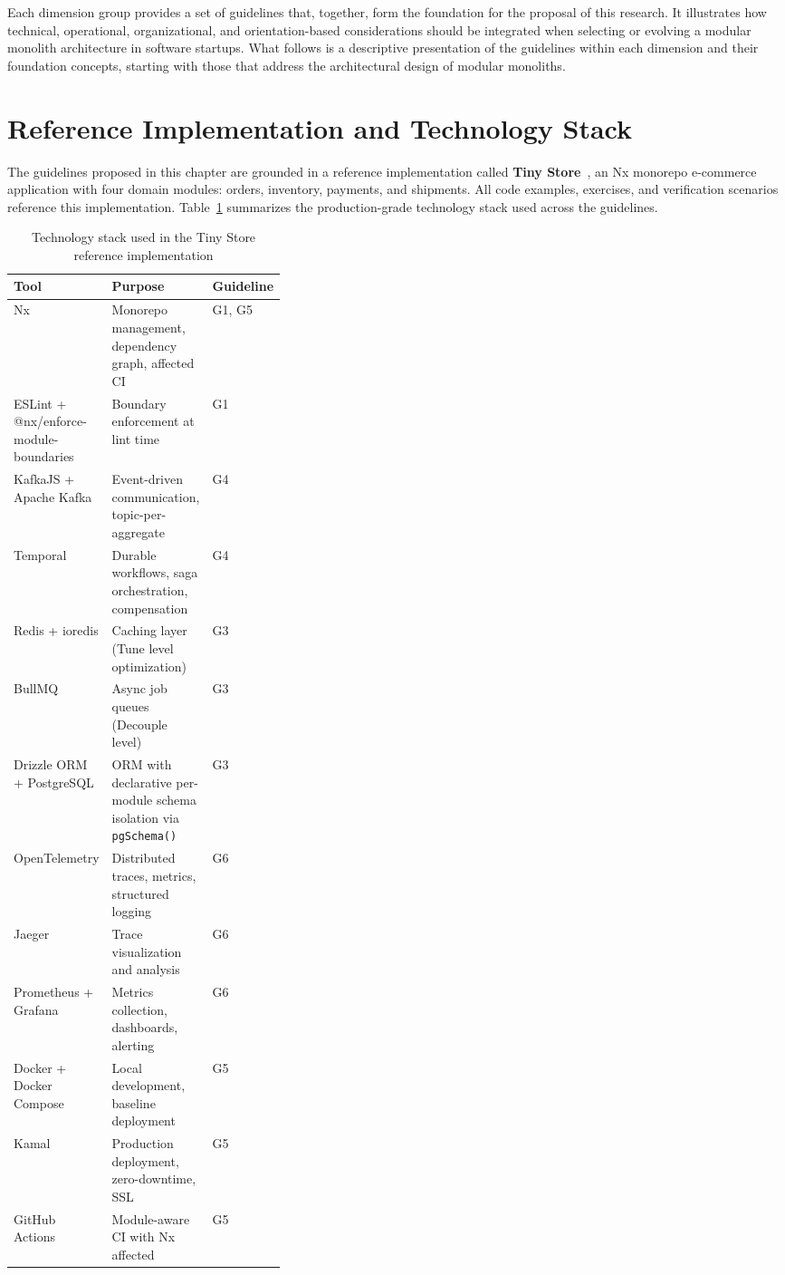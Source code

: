 \noindent
Each dimension group provides a set of guidelines that, together, form the foundation for the proposal of this research. It illustrates how technical, operational, organizational, and orientation-based considerations should be integrated when selecting or evolving a modular monolith architecture in software startups. What follows is a descriptive presentation of the guidelines within each dimension and their foundation concepts, starting with those that address the architectural design of modular monoliths.

\clearpage
\section{Reference Implementation and Technology Stack}
\label{sec:tech-stack}

The guidelines proposed in this chapter are grounded in a reference implementation called \textbf{Tiny Store}~\cite{tinystore2026}, an Nx monorepo e-commerce application with four domain modules: orders, inventory, payments, and shipments. All code examples, exercises, and verification scenarios reference this implementation. Table~\ref{tab:tech-stack} summarizes the production-grade technology stack used across the guidelines.

\begin{table}[H]
\centering
\caption{Technology stack used in the Tiny Store reference implementation}
\label{tab:tech-stack}
\small
\begin{tabularx}{\linewidth}{p{0.25\linewidth} X p{0.10\linewidth}}
\toprule
\textbf{Tool} & \textbf{Purpose} & \textbf{Guideline} \\
\midrule
Nx & Monorepo management, dependency graph, affected CI & G1, G5 \\
ESLint + @nx/enforce-module-boundaries & Boundary enforcement at lint time & G1 \\
KafkaJS + Apache Kafka & Event-driven communication, topic-per-aggregate & G4 \\
Temporal & Durable workflows, saga orchestration, compensation & G4 \\
Redis + ioredis & Caching layer (Tune level optimization) & G3 \\
BullMQ & Async job queues (Decouple level) & G3 \\
Drizzle ORM + PostgreSQL & ORM with declarative per-module schema isolation via \texttt{pgSchema()} & G3 \\
OpenTelemetry & Distributed traces, metrics, structured logging & G6 \\
Jaeger & Trace visualization and analysis & G6 \\
Prometheus + Grafana & Metrics collection, dashboards, alerting & G6 \\
Docker + Docker Compose & Local development, baseline deployment & G5 \\
Kamal & Production deployment, zero-downtime, SSL & G5 \\
GitHub Actions & Module-aware CI with Nx affected & G5 \\
\bottomrule
\end{tabularx}
\end{table}

